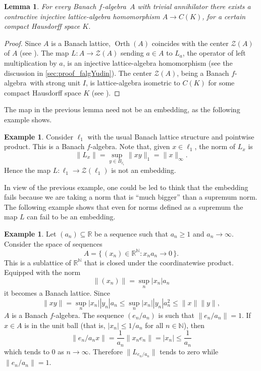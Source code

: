 \documentclass{memo-l}
\newtheorem{lem}[theorem]{Lemma}
\theoremstyle{definition}
\newtheorem{example}[theorem]{Example}
\theoremstyle{remark}
\numberwithin{section}{chapter}
\numberwithin{equation}{chapter}
\newcommand\N{\ensuremath{\mathbb{N}}}
\newcommand\R{\ensuremath{\mathbb{R}}}
\newcommand{\el}[1]{\ensuremath{\ell_{#1}}}
\newcommand{\falg}{$f\!$-algebra}
\newcommand{\orth}[1]{\operatorname{Orth}(#1)}
\begin{document}
\begin{lem}\label{lem:zeroan}
    For every Banach \falg\ $A$ with trivial
    annihilator there exists a contractive injective lattice-algebra
    homomorphism $A\to C(K)$, for a certain compact Hausdorff space
    $K$.
\end{lem}
\begin{proof}
    Since $A$ is a Banach lattice, $\orth A$ coincides with the center
    $\mathcal{Z}(A)$ of $A$ (see \cite[Theorem
    3.29]{abramovich_aliprantis2002}). The map $L\colon A\to \mathcal{Z}(A)$
    sending $a \in A$ to $L_a$, the operator of left multiplication by
    $a$, is an injective lattice-algebra homomorphism (see the discussion in
    \cref{sec:proof_falgYudin}). The center
    $\mathcal{Z}(A)$, being a Banach \falg\ with strong unit $I$, is
    lattice-algebra isometric to $C(K)$ for some compact Hausdorff
    space $K$ (see \cite[Proposition 1.4]{martignon1980}).
\end{proof}

The map in the previous lemma need not be an embedding, as the following
example shows.

\begin{example}\label{ex:not_embed}
    Consider $\el 1$ with the usual Banach lattice structure and
    pointwise product. This is a Banach \falg. Note that, given $x \in
    \el 1$, the norm of $L_x$ is
    \[
    \|L_x\|=\sup_{y \in B_{\el 1}} \|xy\|_1=\|x\|_\infty.
    \]
    Hence the map $L\colon \el 1\to \mathcal{Z}(\el 1)$ is not an
    embedding.
\end{example}

In view of the previous example, one could be led to think that the
embedding fails because we are taking a norm that is ``much bigger''
than a supremum norm. The following example shows that even for norms
defined as a supremum the map $L$ can fail to be an embedding.

\begin{example}
    Let $(a_n)\subseteq \R$ be a sequence such that $a_n\ge 1$ and
    $a_n\to \infty $. Consider the space of sequences
    \[
    A=\{\, (x_n)\in \R^{\N} : x_na_n\to 0 \, \} .
    \]
    This is a sublattice of $\R^{\N}$ that is closed under the
    coordinatewise product. Equipped with the norm
    \[
    \|(x_n)\|=\sup_n |x_n|a_n
    \]
    it becomes a Banach lattice. Since
    \[
    \|xy\|=\sup_n |x_n| |y_n|a_n\le \sup_n |x_n| |y_n| a_n^2\le \|x\|
    \|y\|,
    \]
    $A$ is a Banach \falg. The sequence $(e_n/a_n)$ is such that
    $\|e_n/a_n\|=1$. If $x \in A$ is in the unit ball (that is,
    $|x_n|\le 1/a_n$ for all $n \in \N$), then
    \[
    \|e_n/a_n x\|=\frac{1}{a_n} \|x_n e_n\|=|x_{n}|\le \frac{1}{a_n}
    \]
    which tends to $0$ as $n\to \infty $. Therefore $\|L_{e_n/a_n}\|$
    tends to zero while $\|e_n/a_n\|=1$.
\end{example}
\end{document}
